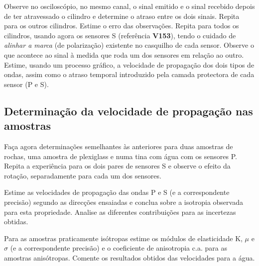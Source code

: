 \documentclass[a4paper,12pt]{article}
\begin{document}
Observe no osciloscópio, no mesmo canal, o sinal emitido e o sinal recebido depois de ter atravessado o cilindro e determine o atraso entre os dois sinais. Repita para os outros cilindros. Estime o erro das observações.
Repita para todos os cilindros, usando agora os sensores S (referência  \textbf{V153}), tendo o cuidado de  \emph{alinhar a marca}  (de polarização) existente no casquilho de cada sensor. 
Observe o que acontece ao sinal à medida que roda um dos sensores em relação ao outro.
Estime, usando um processo gráfico, a velocidade de propagação dos dois tipos de ondas, assim como o atraso temporal introduzido pela camada protectora de cada sensor (P e S).

\subsection{\sf Determinação da velocidade de propagação nas amostras}
Faça agora determinações semelhantes às anteriores para duas amostras de rochas, uma amostra de plexiglass e numa tina com água  com os sensores P. Repita a experiência para os dois pares de sensores S e observe o efeito da rotação, separadamente para cada um dos sensores.

Estime as velocidades de propagação das ondas P e S (e a correspondente precisão) segundo as direcções ensaiadas e conclua sobre a isotropia observada para esta propriedade. Analise as diferentes contribuições para as incertezas obtidas.

Para as amostras praticamente isótropas estime os módulos de elasticidade K, $\mu$ e $\sigma$ (e a correspondente precisão) e o coeficiente de anisotropia c.a. para as amostras anisótropas.
Comente os resultados obtidos das velocidades para a água.




\end{document}
